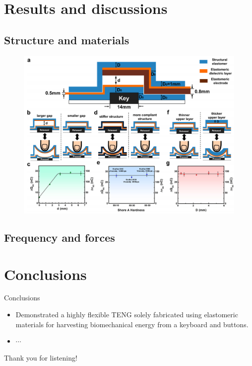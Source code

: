 \documentclass[aspectratio=149,12pt]{beamer}
\begin{document}
\section{Results and discussions}
\subsection{Structure and materials}
\begin{frame}
\begin{figure}[thpb]
\centering

\includegraphics[scale=0.26]{figures/03.png}

\end{figure}
\end{frame}

\subsection{Frequency and forces}
\begin{frame}

\end{frame}


\section{Conclusions}
\begin{frame}{Conclusions}
\begin{itemize}
\item  Demonstrated a highly flexible TENG solely fabricated using elastomeric materials for harvesting biomechanical energy from a \alert{keyboard} and \alert{buttons}.
\item $\cdots$
\end{itemize}
\end{frame}

\begin{frame}
\Huge\qquad Thank you for listening!
\end{frame}
\end{document}
